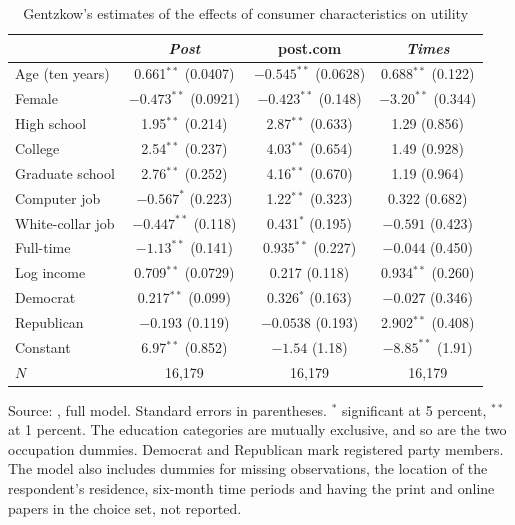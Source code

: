 \begin{table}[htbp]
\centering
\caption{Gentzkow's estimates of the effects of consumer characteristics on utility}\label{tab:10-gentzkow-obs}
\small
\begin{tabular}{@{}lccc@{}}
\toprule
 & \textit{Post} & post.com & \textit{Times} \\
\midrule
Age (ten years)   & 0.661$^{**}$ (0.0407)   & $-0.545^{**}$ (0.0628)  & 0.688$^{**}$ (0.122) \\
Female            & $-0.473^{**}$ (0.0921)  & $-0.423^{**}$ (0.148)   & $-3.20^{**}$ (0.344) \\
High school       & 1.95$^{**}$ (0.214)     & 2.87$^{**}$ (0.633)     & 1.29 (0.856) \\
College           & 2.54$^{**}$ (0.237)     & 4.03$^{**}$ (0.654)     & 1.49 (0.928) \\
Graduate school   & 2.76$^{**}$ (0.252)     & 4.16$^{**}$ (0.670)     & 1.19 (0.964) \\
Computer job      & $-0.567^{*}$ (0.223)    & 1.22$^{**}$ (0.323)     & 0.322 (0.682) \\
White-collar job  & $-0.447^{**}$ (0.118)   & 0.431$^{*}$ (0.195)     & $-0.591$ (0.423) \\
Full-time         & $-1.13^{**}$ (0.141)    & 0.935$^{**}$ (0.227)    & $-0.044$ (0.450) \\
Log income        & 0.709$^{**}$ (0.0729)   & 0.217 (0.118)           & 0.934$^{**}$ (0.260) \\
Democrat          & 0.217$^{**}$ (0.099)    & 0.326$^{*}$ (0.163)     & $-0.027$ (0.346) \\
Republican        & $-0.193$ (0.119)        & $-0.0538$ (0.193)       & 2.902$^{**}$ (0.408) \\
Constant          & 6.97$^{**}$ (0.852)     & $-1.54$ (1.18)          & $-8.85^{**}$ (1.91) \\
\midrule
$N$               & 16,179                  & 16,179                  & 16,179 \\
\bottomrule
\end{tabular}

\smallskip
\begin{minipage}{0.92\textwidth}
\footnotesize Source: \citet[Table~5]{Gentzkow2007}, full model. Standard errors in parentheses. $^{*}$ significant at
5 percent, $^{**}$ at 1 percent. The education categories are mutually exclusive, and so are the two occupation
dummies. Democrat and Republican mark registered party members. The model also includes dummies for missing
observations, the location of the respondent's residence, six-month time periods and having the print and online
papers in the choice set, not reported.
\end{minipage}
\end{table}

